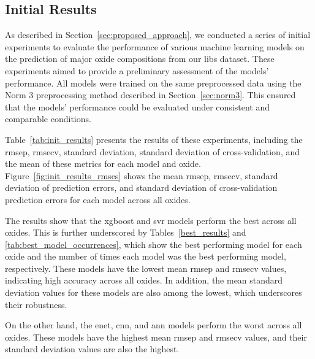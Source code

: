 \subsection{Initial Results}
As described in Section~\ref{sec:proposed_approach}, we conducted a series of initial experiments to evaluate the performance of various machine learning models on the prediction of major oxide compositions from our \gls{libs} dataset.
These experiments aimed to provide a preliminary assessment of the models' performance.
All models were trained on the same preprocessed data using the Norm 3 preprocessing method described in Section~\ref{sec:norm3}.
This ensured that the models' performance could be evaluated under consistent and comparable conditions.

Table~\ref{tab:init_results} presents the results of these experiments, including the \gls{rmsep}, \gls{rmsecv}, standard deviation, standard deviation of cross-validation, and the mean of these metrics for each model and oxide.
Figure~\ref{fig:init_results_rmses} shows the mean \gls{rmsep}, \gls{rmsecv}, standard deviation of prediction errors, and standard deviation of cross-validation prediction errors for each model across all oxides.

The results show that the \gls{xgboost} and \gls{svr} models perform the best across all oxides.
This is further underscored by Tables~\ref{best_results} and \ref{tab:best_model_occurrences}, which show the best performing model for each oxide and the number of times each model was the best performing model, respectively.
These models have the lowest mean \gls{rmsep} and \gls{rmsecv} values, indicating high accuracy across all oxides.
In addition, the mean standard deviation values for these models are also among the lowest, which underscores their robustness.

On the other hand, the \gls{enet}, \gls{cnn}, and \gls{ann} models perform the worst across all oxides.
These models have the highest mean \gls{rmsep} and \gls{rmsecv} values, and their standard deviation values are also the highest.

